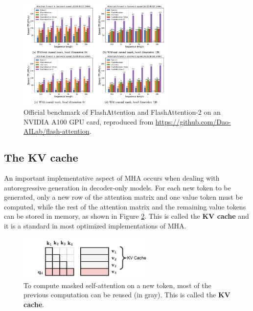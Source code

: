 \begin{figure}[t]
    \centering
    \includegraphics[width=0.7\textwidth]{images/flash2_a100_fwd_bwd_benchmark.png}
    \caption[Official benchmark of FlashAttention and FlashAttention-2 on an NVIDIA A100 GPU card.]{Official benchmark of FlashAttention and FlashAttention-2 on an NVIDIA A100 GPU card, reproduced from \url{https://github.com/Dao-AILab/flash-attention}.}
    \label{fig:flash_attention}
\end{figure}

\subsection{The KV cache}

An important implementative aspect of MHA occurs when dealing with autoregressive generation in decoder-only models. For each new token to be generated, only a new row of the attention matrix and one value token must be computed, while the rest of the attention matrix and the remaining value tokens can be stored in memory, as shown in Figure \ref{fig:kv_cache}. This is called the \textbf{KV cache} and it is a standard in most optimized implementations of MHA.

\begin{figure}
    \centering
    \hspace{-0.5em}\includegraphics[width=0.6\textwidth]{images/kv_cache}
    \caption{To compute masked self-attention on a new token, most of the previous computation can be reused (in gray). This is called the \textbf{KV cache}.}
    \label{fig:kv_cache}
\end{figure}

